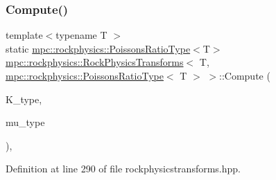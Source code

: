 \subsubsection{\texorpdfstring{Compute()}{Compute()}\hspace{0.1cm}{\footnotesize\ttfamily [3/6]}}
{\footnotesize\ttfamily template$<$typename T $>$ \\
static \mbox{\hyperlink{structmpc_1_1rockphysics_1_1_poissons_ratio_type}{mpc\+::rockphysics\+::\+Poissons\+Ratio\+Type}}$<$T$>$ \mbox{\hyperlink{structmpc_1_1rockphysics_1_1_rock_physics_transforms}{mpc\+::rockphysics\+::\+Rock\+Physics\+Transforms}}$<$ T, \mbox{\hyperlink{structmpc_1_1rockphysics_1_1_poissons_ratio_type}{mpc\+::rockphysics\+::\+Poissons\+Ratio\+Type}}$<$ T $>$ $>$\+::Compute (\begin{DoxyParamCaption}\item[{const \mbox{\hyperlink{structmpc_1_1rockphysics_1_1_bulk_modulus_type}{mpc\+::rockphysics\+::\+Bulk\+Modulus\+Type}}$<$ T $>$ \&}]{K\+\_\+type,  }\item[{const \mbox{\hyperlink{structmpc_1_1rockphysics_1_1_shear_modulus_type}{mpc\+::rockphysics\+::\+Shear\+Modulus\+Type}}$<$ T $>$ \&}]{mu\+\_\+type }\end{DoxyParamCaption})\hspace{0.3cm}{\ttfamily [inline]}, {\ttfamily [static]}}



Definition at line 290 of file rockphysicstransforms.\+hpp.

\mbox{\label{structmpc_1_1rockphysics_1_1_rock_physics_transforms_3_01_t_00_01mpc_1_1rockphysics_1_1_poissons_ratio_type_3_01_t_01_4_01_4_af9d0a0a7242bd0a65cacc4d6828833d8}} 
